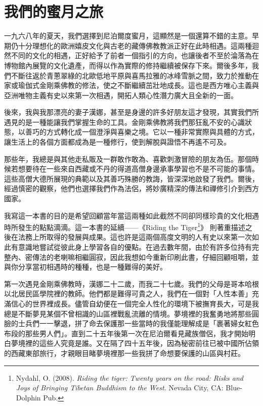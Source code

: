 
\chapter{我們的蜜月之旅}
一九六八年的夏天，我們選擇到尼泊爾度蜜月，這顯然是一個還算不錯的主意。早期仍十分理想化的歐洲嬉皮文化與古老的藏傳佛教教派正好在此時相遇。這兩種迴然不同的文化的相遇，正好給予了前者一個指引的方向，也讓後者不至於淪落為在博物館內展覽的文化遺產，而得以作為實際的修持繼續被保存下來。爾後多年，我們不斷往返於青蔥翠綠的北歐低地平原與喜馬拉雅的冰峰雪脈之間，致力於推動在家或瑜伽式金剛乘佛教的修法，使之不斷繼續茁壯地成長。這也是西方唯心主義與亞洲唯物主義有史以來第一次相遇，開拓人類心性潛力廣大且全新的一面。

後來，我與我那漂亮的妻子漢娜，甚至是身邊的許多好朋友這才發現，其實我們所遇見的是一種能讓我們掌握生命的工具。金剛乘佛教將我們那狂亂不安的心識狀態，以善巧的方式轉化成一個澄淨與喜樂之境。它以一種非常實際與具體的方式，讓生活上的各個方面都成為是一種修行，使到解脫與證悟不再遙不可及。

那些年，我總是與其他走私販及一群敢作敢為、喜歡刺激冒險的朋友為伍。那個時候若想要待在一些來自西藏或不丹的得道高僧身邊承事學習也不是不可能的事情。這些高僧大德所展現的典範以及其善巧殊勝的教誨，皆深深地啟發了我們。爾後，經過慎密的觀察，他們也選擇我們作為法侶，將妙廣精深的傳法和禪修引介到西方國家。

我寫這一本書的目的是希望回顧當年當這兩種如此截然不同卻同樣珍貴的文化相遇時所發生的點點滴滴。這一本書的延續——《Riding the Tiger\footnote{Nydahl, O. (2008). \textit{Riding the tiger: Twenty years on the road: Risks and Joys of Bringing Tibetan Buddhism to the West.} Nevada City, CA: Blue-Dolphin Pub. }》%
則著重描述之後在法務上所取得的發展與成果。這也許是這兩個高度文明的人有史以來第一次如此有意識地嘗試從彼此身上學習各自的優點。在過去數年間，由於有許多位持有完整內、密傳法的老喇嘛相繼圓寂，因此我想如今重新印刷此書，仔細回顧咀嚼，並與你分享當初相遇時的種種，也是一種難得的美好。

第一次遇見金剛乘佛教時，漢娜二十二歲，而我二十七歲。我們的父母是哥本哈根以北居民區學院裡的教師。他們都是難得可貴之人，我們在一個對「人性本善」充滿信心的世界裡成長。儘管自幼便在一個完全人性化的環境下被撫育長大，可是我總是不斷夢見某個不曾相識的山區裡戰亂流離的情境。夢境裡的我奮勇地將那些圓臉的士兵們一一擊退，拼了命去保護那一些當時的我僅能理解成是「裹著婦女紅色布段的那些男人們」。直到二十五年後第一次在尼泊爾看見藏族僧侶，我才開始明白夢境裡的這些人究竟是誰。又在隔了四十五年後，因為秘密前往已被中國所佔領的西藏東部旅行，才親眼目睹夢境裡那一些我拼了命想要保護的山區與村莊。

